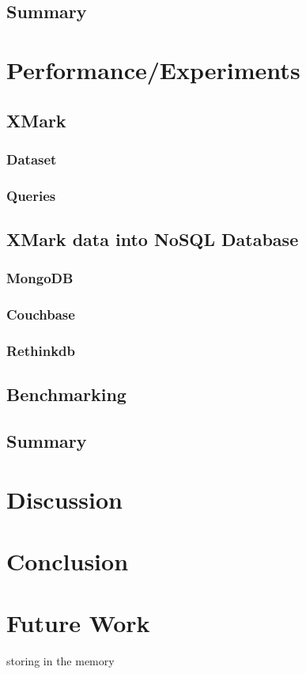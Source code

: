 \documentclass[a4paper,12pt]{article}
\begin{document}
		\subsection{Summary}
	\newpage
	\section{Performance/Experiments}
		\subsection{XMark}
			\subsubsection{Dataset}
			\subsubsection{Queries}
		\subsection{XMark data into NoSQL Database}
			\subsubsection{MongoDB}
			\subsubsection{Couchbase}
			\subsubsection{Rethinkdb}
		\subsection{Benchmarking}
		\subsection{Summary}
	\newpage
	\section{Discussion}
	\section{Conclusion}
	\label{conc}
	
	\newpage
	\section{Future Work}
	\label{s.future}
	storing in the memory
	\newpage
	
	
	\newpage
	\listoffigures
	\newpage
	\listoftables
	\newpage
	\lstlistoflistings
	
\end{document}

